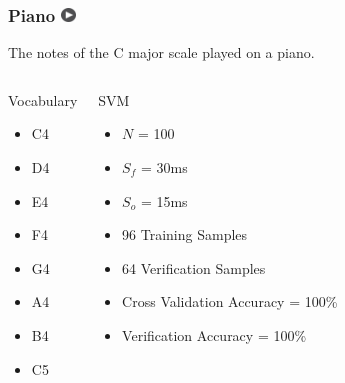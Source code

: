 \documentclass{beamer}
\begin{document}
\begin{frame}
\frametitle{Piano 
\href{images/piano.mp4}{\includegraphics[width=0.15in]{images/play.png}}}
The notes of the C major scale played on a piano.
\begin{columns}[c]
  \column{1.5in}
	\begin{block}{Vocabulary}
		\begin{itemize}
		\item C4
		\item D4
		\item E4
		\item F4
		\item G4
		\item A4
		\item B4
		\item C5
		\end{itemize}
	\end{block}
  \column{2.5in}
  	\begin{block}{SVM}
		\begin{itemize}
		\item $N$ = 100
		\item $S_f$ = 30ms
		\item $S_o$ = 15ms
		\item 96 Training Samples
		\item 64 Verification Samples
		\item \small{Cross Validation Accuracy = 100\%}
		\item Verification Accuracy = 100\%
		\end{itemize}
	\end{block}
\end{columns}
\end{frame}


\end{document}
